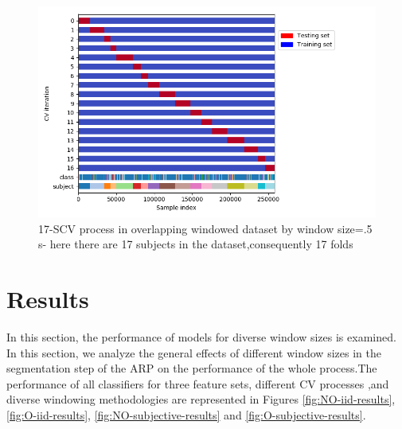 \begin{figure}[h]
    \centering
    \includegraphics[width=.5\textwidth]{Figures/LeaveOneGroupOut.png}
    \caption{17-SCV process in overlapping windowed dataset by window size=.5 s- here there are 17 subjects in the dataset,consequently 17 folds  }
    \label{fig:Subjective-cv}
\end{figure}


\section{Results}

In this section, the performance of models for diverse window sizes is examined.
In this section, we analyze the general effects of different window sizes in the segmentation step of the ARP on the performance of the whole process.The performance of all classifiers for three feature sets, different CV processes ,and diverse windowing methodologies are represented in Figures \ref{fig:NO-iid-results}, \ref{fig:O-iid-results}, \ref{fig:NO-subjective-results} and \ref{fig:O-subjective-results}.


